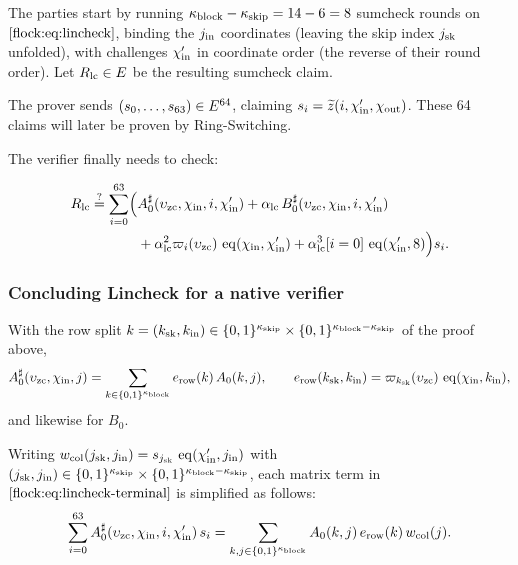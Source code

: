 \vspace{2mm}

The parties start by running $\kappa_{\mathrm{block}} - \kappa_{\mathrm{skip}} = 14 - 6 = 8$ sumcheck rounds on $\eqref{flock:eq:lincheck}$, binding the $j_{\mathrm{in}}$ coordinates (leaving the skip index $j_{\mathrm{sk}}$ unfolded), with challenges $\chi'_{\mathrm{in}}$ in coordinate order (the reverse of their round order). Let $R_{\mathrm{lc}}\in E$ be the resulting sumcheck claim.

The prover sends $(s_0,\ldots,s_{63})\in E^{64}$, claiming $s_i=\widetilde{z}(i,\chi'_{\mathrm{in}},\chi_{\mathrm{out}})$. These 64 claims will later be proven by Ring-Switching.

The verifier finally needs to check:

\begin{equation}\label{flock:eq:lincheck-terminal}
\begin{split}
R_{\mathrm{lc}}\stackrel{?}{=}\sum_{i=0}^{63}\Bigl(&A^{\sharp}_0(\upsilon_{\mathrm{zc}},\chi_{\mathrm{in}},i,\chi'_{\mathrm{in}})+\alpha_{\mathrm{lc}}\,B^{\sharp}_0(\upsilon_{\mathrm{zc}},\chi_{\mathrm{in}},i,\chi'_{\mathrm{in}})\\
&+\alpha_{\mathrm{lc}}^2\varpi_i(\upsilon_{\mathrm{zc}})\,\operatorname{eq}(\chi_{\mathrm{in}},\chi'_{\mathrm{in}})+\alpha_{\mathrm{lc}}^3[i=0]\,\operatorname{eq}(\chi'_{\mathrm{in}},8)\Bigr)s_i.
\end{split}
\end{equation}

\subsubsection{Concluding Lincheck for a native verifier}\label{flock:native}


With the row split $k=(k_{\mathrm{sk}},k_{\mathrm{in}}) \in\{0,1\}^{\kappa_{\mathrm{skip}}} \times \{0,1\}^{\kappa_{\mathrm{block}}-\kappa_{\mathrm{skip}}}$ of the proof above,
\begin{equation}\label{flock:eq:erow}
A^{\sharp}_0(\upsilon_{\mathrm{zc}},\chi_{\mathrm{in}},j)=\sum_{k\in\{0,1\}^{\kappa_{\mathrm{block}}}}e_{\mathrm{row}}(k)\,A_0(k,j),\qquad
e_{\mathrm{row}}(k_{\mathrm{sk}},k_{\mathrm{in}})=\varpi_{k_{\mathrm{sk}}}(\upsilon_{\mathrm{zc}})\,\operatorname{eq}(\chi_{\mathrm{in}},k_{\mathrm{in}}),
\end{equation}
and likewise for $B_0$.

Writing $w_{\mathrm{col}}(j_{\mathrm{sk}},j_{\mathrm{in}})=s_{j_{\mathrm{sk}}}\,\operatorname{eq}(\chi'_{\mathrm{in}},j_{\mathrm{in}})$ with $(j_{\mathrm{sk}},j_{\mathrm{in}}) \in\{0,1\}^{\kappa_{\mathrm{skip}}} \times \{0,1\}^{\kappa_{\mathrm{block}}-\kappa_{\mathrm{skip}}}$, each matrix term in $\eqref{flock:eq:lincheck-terminal}$ is simplified as follows:
\begin{equation}\label{flock:eq:matrix-form}
\sum_{i=0}^{63}A^{\sharp}_0(\upsilon_{\mathrm{zc}},\chi_{\mathrm{in}},i,\chi'_{\mathrm{in}})\,s_i=\sum_{k,j\in\{0,1\}^{\kappa_{\mathrm{block}}}}A_0(k,j)\,e_{\mathrm{row}}(k)\,w_{\mathrm{col}}(j).
\end{equation}

